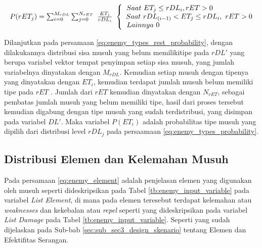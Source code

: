 \begin{equation}\label{eq:enemy_types_rest_probability}
\resizebox{\columnwidth}{!}{%
	$P(rET_{j}) = \sum_{i = 0}^{M_{rDL}} \sum_{j = 0}^{N_{rET}}\ \frac{ET_{j}}{rDL_{i}}\
	\left\{\begin{matrix}
	\hspace{-5.0em} Saat\ ET_{j} \leq rDL_{i}, rET > 0\\
	\hspace{0.5em} Saat\ rDL_{(i-1)} < ET_{j} \leq rDL_{i},\ rET > 0\\
	\hspace{-12.5em} Lainnya\ 0
	\end{matrix}\right.$%
}
\end{equation}

Dilanjutkan pada persamaan \ref{eq:enemy_types_rest_probability}, dengan dilakukannya distribusi sisa musuh yang belum memilikitipe pada $rDL'$ yang berupa variabel vektor tempat penyimpan setiap sisa musuh, yang jumlah variabelnya dinyatakan dengan $M_{rDL}$. Kemudian setiap musuh dengan tipenya yang dinyatakan dengan $ET_{i}$, kemudian terdapat jumlah musuh belum memiliki tipe pada $rET$ . Jumlah dari $rET$ kemudian dinyatakan dengan $N_{rET}$, sebagai pembatas jumlah musuh yang belum memiliki tipe, hasil dari proses tersebut kemudian digabung dengan tipe musuh yang sudah terdistribusi, yang disimpan pada variabel $DL'$. Maka variabel $P(ET_{i})$ adalah probabilitas tipe musuh yang dipilih dari distribusi level $rDL_{j}$ pada persaamaan \ref{eq:enemy_types_probability}.
\vspace{1ex}

\subsection{Distribusi Elemen dan Kelemahan Musuh}
\label{sec:sub_sec3_enemy_weak}
\vspace{1ex}

Pada persamaan \ref{eq:enemy_element} adalah penjelasan elemen yang digunakan oleh musuh seperti dideskripsikan pada Tabel \ref{tb:enemy_input_variable} pada variabel \textit{List Element}, di mana pada elemen teresebut terdapat kelemahan atau \textit{weaknesses} dan kekebalan atau \textit{repel} seperti yang dideskripsikan pada variabel \textit{List Damage} pada Tabel \ref{tb:enemy_input_variable}.  Seperti yang sudah dijelaskan pada Sub-bab \ref{sec:sub_sec3_design_skenario} tentang Elemen dan Efektifitas Serangan. 
\vspace{1ex}

